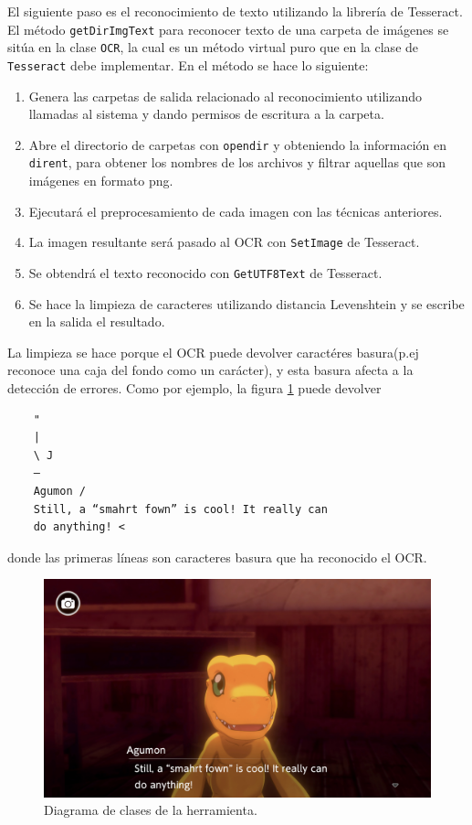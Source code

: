 El siguiente paso es el reconocimiento de texto utilizando la librería de Tesseract. El método \texttt{getDirImgText} para reconocer texto de una carpeta de imágenes se sitúa en la clase \texttt{OCR}, la cual es un método virtual puro que en la clase de \texttt{Tesseract} debe implementar. En el método se hace lo siguiente: 
\begin{enumerate}
	\item Genera las carpetas de salida relacionado al reconocimiento utilizando llamadas al sistema y dando permisos de escritura a la carpeta.
	\item Abre el directorio de carpetas con \texttt{opendir} y obteniendo la información en \texttt{dirent}, para obtener los nombres de los archivos y filtrar aquellas que son imágenes en formato png.
	\item Ejecutará el preprocesamiento de cada imagen con las técnicas anteriores.
	\item La imagen resultante será pasado al OCR con \texttt{SetImage} de Tesseract.
	\item Se obtendrá el texto reconocido con \texttt{GetUTF8Text} de Tesseract.
	\item Se hace la limpieza de caracteres utilizando distancia Levenshtein y se escribe en la salida el resultado.
\end{enumerate}
La limpieza se hace porque el OCR puede devolver caractéres basura(p.ej reconoce una caja del fondo como un carácter), y esta basura afecta a la detección de errores. Como por ejemplo, la figura \ref{fig:Ej.Basura} puede devolver
\begin{verbatim}
	"
	|
	\ J
	—
	Agumon /
	Still, a “smahrt fown” is cool! It really can
	do anything! <
\end{verbatim}
donde las primeras líneas son caracteres basura que ha reconocido el OCR.
\begin{figure}[H]
	\centering
	\includegraphics[width = 1\textwidth]{Imagenes/OCR/Simple.png}
	\caption{Diagrama de clases de la herramienta.}
	\label{fig:Ej.Basura}
\end{figure}
